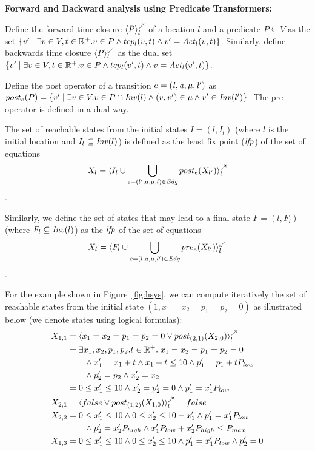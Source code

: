 \textbf{Forward and Backward analysis using Predicate Transformers:}

Define the forward time closure $\langle P \rangle^{\nearrow}_{l}$ of a location $l$ and a predicate $P \subseteq V$ as the set
$\{ v' \; | \; \exists v \in V,t \in \mathbb{R}^+. v \in P \wedge tcp_l(v,t) \wedge v' = \mathit{Act}_l(v,t) \}$.
Similarly, define backwards time closure $\langle P \rangle^{\swarrow}_{l}$ as the dual set 
$\{ v' \; | \; \exists v \in V,t \in \mathbb{R}^+. v \in P \wedge tcp_l(v',t) \wedge v = \mathit{Act}_l(v',t) \}$.

Define the post operator of a transition $e = \mathit{(l,a,\mu,l')}$ as 
$post_e(P) = \{ v' \; | \; \exists v \in V. v \in P \cap \mathit{Inv}(l) \wedge (v,v') \in \mu \wedge v' \in \mathit{Inv}(l') \}$.
The pre operator is defined in a dual way.

The set of reachable states from the initial states $I = (l,I_l)$ (where $l$ is the initial location
and $I_l \subseteq \mathit{Inv}(l)$) 
is defined as the least fix point ($\mathit{lfp}$) of the set of equations 
\[ X_l = \langle I_l \cup \bigcup_{e=(l',a,\mu,l) \in \mathit{Edg}} post_e(X_{l'}) \rangle^{\nearrow}_{l} \].

Similarly, we define the set of states that may lead to a final state $F = (l,F_l)$ (where $F_l \subseteq \mathit{Inv}(l)$) 
as the $\mathit{lfp}$ of the set of equations 
\[X_l = \langle F_l \cup \bigcup_{e=(l,a,\mu,l') \in \mathit{Edg}} pre_e(X_{l'}) \rangle^{\swarrow}_{l} \].

For the example shown in Figure~\ref{fig:hsys}, we can compute iteratively the set of reachable states from 
the initial state $(1,x_1=x_2=p_1=p_2=0)$ as illustrated below (we denote states using logical formulas):
%
\begin{align*}
X_{1,1} & = \langle x_1=x_2=p_1=p_2=0 \vee post_{(2,1)}(X_{2,0}) \rangle^{\nearrow}_{l} \\
		& = \exists x_1,x_2,p_1,p_2. t \in \mathbb{R}^+. \; x_1=x_2=p_1=p_2=0   \\
		& \qquad \wedge x_1' = x_1 + t \wedge x_1 + t \le 10 \wedge p_1' = p_1 + t P_{low} \\ 
		& \qquad \wedge p_2' = p_2 \wedge x_2' = x_2\\
		& = 0 \le x_1' \le 10 \wedge x_2' = p_2' = 0 \wedge p_1' = x_1' P_{low} \\
X_{2,1} &= \langle false \vee post_{(1,2)}(X_{1,0}) \rangle^{\nearrow}_{l} = false  \\
X_{2,2} & = 0 \le x_1' \le 10 \wedge 0 \le x_2' \le 10 - x_1' \wedge p_1' = x_1'P_{low}  \\
		& \qquad \wedge p_2' = x_2' P_{high} \wedge x_1'P_{low} + x_2'P_{high} \le P_{max} \\
X_{1,3} & = 0 \le x_1' \le 10 \wedge 0 \le x_2' \le 10 \wedge p_1' = x_1'P_{low} \wedge p_2' = 0 
\end{align*}

